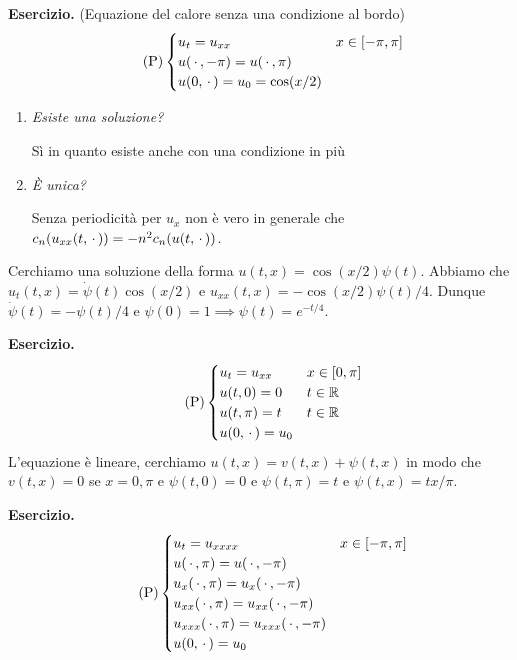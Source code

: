 \textbf{Esercizio.}
(Equazione del calore senza una condizione al bordo)
\begin{equation}
	\tag{P}
	\begin{cases}
		u_t = u_{xx} & x \in [-\pi, \pi] \\
		u(\,\cdot\,, -\pi) = u(\,\cdot\,, \pi) \\
		u(0, \,\cdot\,) = u_0 = \cos(x / 2)
	\end{cases}
\end{equation}
\begin{enumerate}
	\item \textit{Esiste una soluzione?}

		Sì in quanto esiste anche con una condizione in più

	\item \textit{È unica?}

		Senza periodicità per $u_x$ non è vero in generale che $c_n(u_{xx}(t, \,\cdot\,)) = -n^2 c_n(u(t, \,\cdot\,))$.

\end{enumerate}
Cerchiamo una soluzione della forma $u(t, x) = \cos(x/2) \psi(t)$. Abbiamo che $u_t(t, x) = \dot \psi(t) \cos(x / 2)$ e $u_{xx}(t, x) = - \cos(x / 2) \psi(t) / 4$. Dunque $\dot \psi(t) = - \psi(t) / 4$ e $\psi(0) = 1 \implies \psi(t) = e^{-t / 4}$.

\textbf{Esercizio.}
\begin{equation}
	\tag{P}
	\begin{cases}
		u_t = u_{xx} & x \in [0, \pi] \\
		u(t, 0) = 0 & t \in \mathbb R \\
		u(t, \pi) = t & t \in \mathbb R \\
		u(0, \,\cdot\,) = u_0
	\end{cases}
\end{equation}
L'equazione è lineare, cerchiamo $u(t, x) = v(t, x) + \psi(t, x)$ in modo che $v(t, x) = 0$ se $x = 0, \pi$ e $\psi(t, 0) = 0$ e $\psi(t, \pi) = t$ e $\psi(t, x) = t x / \pi$.

\textbf{Esercizio.}
\begin{equation}
	\tag{P}
	\begin{cases}
		u_t = u_{xxxx} & x \in [-\pi, \pi] \\
		u(\,\cdot\,, \pi) = u(\,\cdot\,, -\pi) \\
		u_x(\,\cdot\,, \pi) = u_x(\,\cdot\,, -\pi) \\
		u_{xx}(\,\cdot\,, \pi) = u_{xx}(\,\cdot\,, -\pi) \\
		u_{xxx}(\,\cdot\,, \pi) = u_{xxx}(\,\cdot\,, -\pi) \\
		u(0, \,\cdot\,) = u_0
	\end{cases}
\end{equation}

